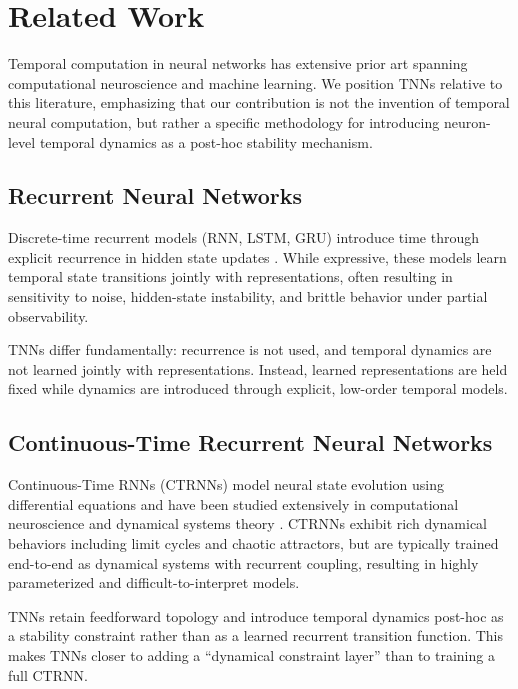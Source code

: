 \documentclass[11pt]{article}
\begin{document}
\section{Related Work}

Temporal computation in neural networks has extensive prior art spanning computational neuroscience and machine learning. We position TNNs relative to this literature, emphasizing that our contribution is not the invention of temporal neural computation, but rather a specific methodology for introducing neuron-level temporal dynamics as a post-hoc stability mechanism.

\subsection{Recurrent Neural Networks}

Discrete-time recurrent models (RNN, LSTM, GRU) introduce time through explicit recurrence in hidden state updates \citep{hochreiter1997lstm, cho2014gru}. While expressive, these models learn temporal state transitions jointly with representations, often resulting in sensitivity to noise, hidden-state instability, and brittle behavior under partial observability.

TNNs differ fundamentally: recurrence is not used, and temporal dynamics are not learned jointly with representations. Instead, learned representations are held fixed while dynamics are introduced through explicit, low-order temporal models.

\subsection{Continuous-Time Recurrent Neural Networks}

Continuous-Time RNNs (CTRNNs) model neural state evolution using differential equations and have been studied extensively in computational neuroscience and dynamical systems theory \citep{beer1995ctrnn}. CTRNNs exhibit rich dynamical behaviors including limit cycles and chaotic attractors, but are typically trained end-to-end as dynamical systems with recurrent coupling, resulting in highly parameterized and difficult-to-interpret models.

TNNs retain feedforward topology and introduce temporal dynamics post-hoc as a stability constraint rather than as a learned recurrent transition function. This makes TNNs closer to adding a ``dynamical constraint layer'' than to training a full CTRNN.
\end{document}
